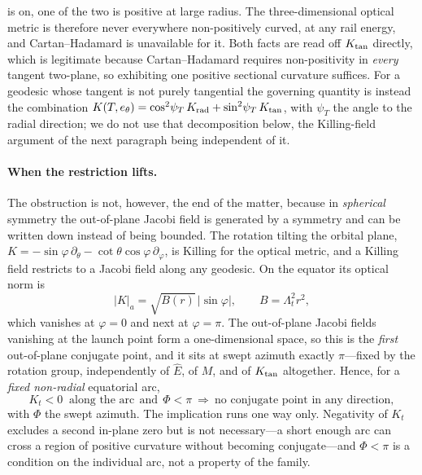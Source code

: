 \documentclass[12pt]{iopart}
\theoremstyle{plain}
\theoremstyle{definition}
\theoremstyle{remark}
\newcommand{\Ehat}{\hat E}
\begin{document}
is on, one of the two is positive at large radius. The three-dimensional optical
metric is therefore never everywhere non-positively curved, at any rail energy,
and Cartan--Hadamard is unavailable for it. Both facts are read off
$K_{\rm tan}$ directly, which is legitimate because Cartan--Hadamard requires
non-positivity in \emph{every} tangent two-plane, so exhibiting one positive
sectional curvature suffices. For a geodesic whose tangent is not purely
tangential the governing quantity is instead the combination
$K(T,e_\theta)=\cos^2\!\psi_T\,K_{\rm rad}+\sin^2\!\psi_T\,K_{\rm tan}$, with
$\psi_T$ the angle to the radial direction; we do not use that decomposition
below, the Killing-field argument of the next paragraph being independent of it.

\paragraph{When the restriction lifts.} The obstruction is not, however, the end
of the matter, because in \emph{spherical} symmetry the out-of-plane Jacobi field
is generated by a symmetry and can be written down instead of being bounded. The
rotation tilting the orbital plane, $K=-\sin\varphi\,\partial_\theta
-\cot\theta\cos\varphi\,\partial_\varphi$, is Killing for the optical metric, and
a Killing field restricts to a Jacobi field along any geodesic. On the equator
its optical norm is
\begin{equation}
    |K|_a=\sqrt{B(r)}\,\bigl|\sin\varphi\bigr| ,\qquad B=\Lambda_t^2r^2 ,
    \label{eq:outofplane-J}
\end{equation}
which vanishes at $\varphi=0$ and next at $\varphi=\pi$. The out-of-plane Jacobi
fields vanishing at the launch point form a one-dimensional space, so this is the
\emph{first} out-of-plane conjugate point, and it sits at swept azimuth exactly
$\pi$---fixed by the rotation group, independently of $\Ehat$, of $M$, and of
$K_{\rm tan}$ altogether. Hence, for a \emph{fixed non-radial} equatorial arc,
\begin{equation}
    K_t<0 \ \text{ along the arc} \ \ \text{and} \ \ \Phi<\pi
    \ \Longrightarrow\
    \text{no conjugate point in any direction} ,
    \label{eq:noconj-full}
\end{equation}
with $\Phi$ the swept azimuth. The implication runs one way only. Negativity of
$K_t$ excludes a second in-plane zero but is not necessary---a short enough arc can
cross a region of positive curvature without becoming conjugate---and $\Phi<\pi$ is
a condition on the individual arc, not a property of the family.
\end{document}
